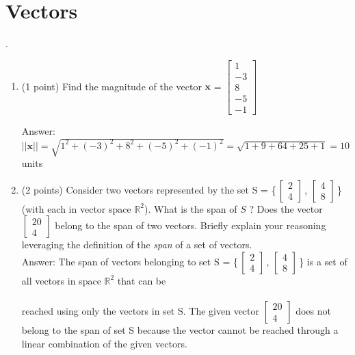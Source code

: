 \documentclass{article}%
\begin{document}
\section*{Vectors}.
\begin{enumerate}
    \item (1 point) Find the magnitude of the vector $\mathbf{x}$ = $\begin{bmatrix} 
    1 \\ -3 \\ 8 \\ -5 \\ -1  \end{bmatrix}$\vspace{2ex}\\

    \vspace{2ex}


    Answer: $\mathbf{||x||} = \sqrt{1^2 + (-3)^2 + 8^2 + (-5)^2 + (-1)^2} = \sqrt{1 + 9 + 64 + 25 + 1} = 10$ units
    
    \item (2 points) Consider two vectors represented by the set 
    S = \bigg\{$\,\begin{bmatrix} 2\\ 4 \end{bmatrix}$\,, $\begin{bmatrix} 4\\ 8 \end{bmatrix}\,$\bigg\} (with each in vector space $\mathbb{R}^2$). What is the span of $S$ ? Does the vector $\begin{bmatrix} 20\\ 4 \end{bmatrix}$ belong to the span of two vectors. Briefly explain your reasoning leveraging the definition of the \emph{span} of a set of vectors. \vspace{2ex}\\


    Answer: The span of vectors belonging to set S = \bigg\{$\,\begin{bmatrix} 2\\ 4 \end{bmatrix}$\,, $\begin{bmatrix} 4\\ 8 \end{bmatrix}\,$\bigg\} is a set of all vectors in space $\mathbb{R}^2$ that can be \\ \\reached 
    using only the vectors in set S. The given vector $\begin{bmatrix}
        20\\ 4
    \end{bmatrix}$ does not belong to the span of set S because the vector cannot be reached through a linear combination of the given vectors.
\end{enumerate}
\end{document}
